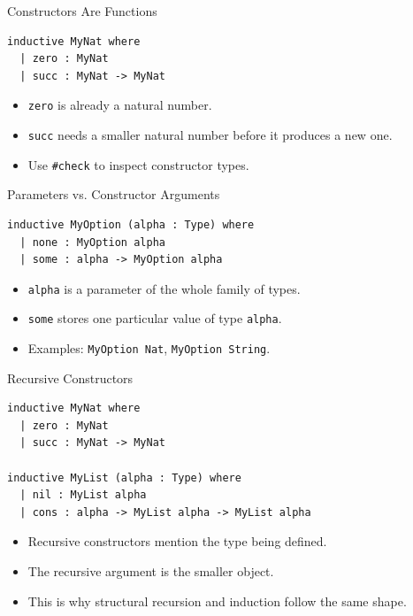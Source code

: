 ﻿\documentclass[aspectratio=169,11pt]{beamer}
\begin{document}
\begin{frame}[fragile]{Constructors Are Functions}
  \begin{lstlisting}
inductive MyNat where
  | zero : MyNat
  | succ : MyNat -> MyNat
  \end{lstlisting}

  \begin{itemize}
    \item \texttt{zero} is already a natural number.
    \item \texttt{succ} needs a smaller natural number before it produces a new one.
    \item Use \texttt{\#check} to inspect constructor types.
  \end{itemize}
\end{frame}

\begin{frame}[fragile]{Parameters vs. Constructor Arguments}
  \begin{lstlisting}
inductive MyOption (alpha : Type) where
  | none : MyOption alpha
  | some : alpha -> MyOption alpha
  \end{lstlisting}

  \begin{itemize}
    \item \texttt{alpha} is a parameter of the whole family of types.
    \item \texttt{some} stores one particular value of type \texttt{alpha}.
    \item Examples: \texttt{MyOption Nat}, \texttt{MyOption String}.
  \end{itemize}
\end{frame}

\begin{frame}[fragile]{Recursive Constructors}
  \begin{lstlisting}
inductive MyNat where
  | zero : MyNat
  | succ : MyNat -> MyNat

inductive MyList (alpha : Type) where
  | nil : MyList alpha
  | cons : alpha -> MyList alpha -> MyList alpha
  \end{lstlisting}

  \begin{itemize}
    \item Recursive constructors mention the type being defined.
    \item The recursive argument is the smaller object.
    \item This is why structural recursion and induction follow the same shape.
  \end{itemize}
\end{frame}
\end{document}
